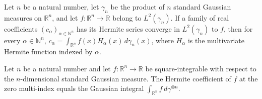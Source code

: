 \begin{theorem}
\label{BooleanAnalysis.GaussianSpace.hermite_expansion_unique}
\leanok
{}
Let $n$ be a natural number, let $\gamma_n$ be the product of $n$ standard Gaussian
measures on $\mathbb R^n$, and let $f:\mathbb R^n\to\mathbb R$ belong to
$L^2(\gamma_n)$. If a family of real coefficients $(c_\alpha)_{\alpha\in\mathbb N^n}$
has its Hermite series converge in $L^2(\gamma_n)$ to $f$, then for every
$\alpha\in\mathbb N^n$, $c_\alpha=\int_{\mathbb R^n} f(x)H_\alpha(x)\,d\gamma_n(x)$,
where $H_\alpha$ is the multivariate Hermite function indexed by $\alpha$.
\end{theorem}

\begin{theorem}
\label{BooleanAnalysis.GaussianSpace.hermiteCoeff_zero}
\leanok
{}
Let $n$ be a natural number and let $f:\mathbb R^n\to\mathbb R$ be square-integrable
with respect to the $n$-dimensional standard Gaussian measure. The Hermite coefficient
of $f$ at the zero multi-index equals the Gaussian integral $\int_{\mathbb R^n}
f\,d\gamma^{\otimes n}$.
\end{theorem}

